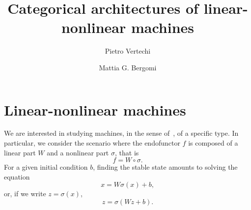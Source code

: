 \documentclass[12pt]{article}
\title{Categorical architectures of linear-nonlinear machines}
\author{
    Pietro Vertechi \and Mattia G. Bergomi
}
\date{}
\begin{document}
\maketitle
\begin{abstract}
\end{abstract}

\section{Linear-nonlinear machines}

We are interested in studying machines, in the sense of~\cite{2020arXiv200702777V}, of a specific type. In particular, we consider the scenario where the endofunctor $f$ is composed of a linear part $W$ and a nonlinear part $\sigma$, that is
\begin{equation*}
    f = W\circ \sigma.
\end{equation*}
For a given initial condition $b$, finding the stable state amounts to solving the equation
\begin{equation*}
    x = W\sigma(x) + b,
\end{equation*}
or, if we write $z = \sigma(x)$,
\begin{equation*}
    z = \sigma(Wz + b).
\end{equation*}
\end{document}
